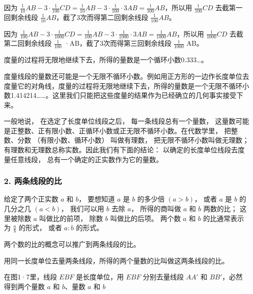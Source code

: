 因为
\(\frac{1}{10} AB - 3 \cdot \frac{1}{100} CD = \frac{1}{10} AB - 3 \cdot \frac{1}{100} \cdot 3AB = \frac{1}{100} AB\)，所以用
\(\frac{1}{100} CD\) 去截第一回剩余线段
\(\frac{1}{10} AB\)，截了3次而得第二回剩余线段 \(\frac{1}{100} AB\)。

因为
\(\frac{1}{100} AB - 3 \cdot \frac{1}{1000} CD = \frac{1}{100} AB - 3 \cdot \frac{1}{1000} \cdot 3AB = \frac{1}{1000} AB\)，所以用
\(\frac{1}{1000} CD\) 去截第二回剩余线段 \(\frac{1}{100}\)
·AB，截了3次而得第三回剩余线段 \(\frac{1}{1000}\) AB。

度量的过程将无限地继续下去，所得的量数是一个循环小数0.333\ldots。

度量线段的量数还可能是一个无限不循环小数。例如用正方形的一边作长度单位去度量它的对角线，度量的过程将无限地继续下去，所得的量数是一个无限不循环小数1.414214\ldots\ldots。这里我们只能把这些度量的结果作为已经确立的几何事实接受下来。

一般地说， 在选定了长度单位线段之后， 每一条线段总有一个量数，
这量数可能是正整数、正有限小数、正循环小数或正无限不循环小数。在代数学里，
把整数、分数 （有限小数、循环小数） 叫做有理数，
把无限不循环小数叫做无理数；
有理数和无理数总称实数。因此我们有下面的结论：
以确定的长度单位线段去度量任意线段， 总有一个确定的正实数作为它的量数。

\subsubsection{2.
两条线段的比}

给定了两个正实数 \(a\) 和 \(b\)， 要想知道 \(a\) 是 \(b\) 的多少倍
\((a > b)\)， 或者 \(a\) 是 \(b\) 的几分之几 \((a < b)\)， 我们可以用
\(b\) 去除 \(a\)， 所得的商叫做 \(a\) 和 \(b\) 两数的比； 这里被除数
\(a\) 叫做比的前项， 除数 \(b\) 叫做比的后项。 两个数 \(a\) 和 \(b\)
的比通常表示为 \(\frac{a}{b}\) 的形式， 或者 \(a:b\) 的形式。

两个数的比的概念可以推广到两条线段的比。

用同一长度单位去量两条线段，所得的两个量数的比叫做这两条线段的比。

在图1·7里，线段 \(EBF\) 是长度单位，用 \(EBF\) 分别去量线段 \(AA'\) 和
\(BB'\)，必然得到两个量数 \(a\) 和 \(b\)、量数 \(a\) 和 \(b\)

